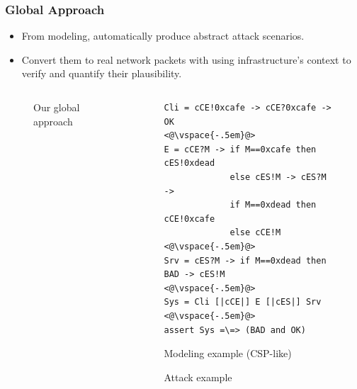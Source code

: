 \documentclass{beamer}
\begin{document}
\begin{frame}[fragile]
    \frametitle{Global Approach}
                    
    \begin{itemize}
        \item From modeling, automatically produce abstract attack scenarios.
        \item Convert them to real network packets with using infrastructure's context to verify and quantify their plausibility.
    \end{itemize}

    \begin{columns}[c]
        \begin{column}{.5\textwidth}
            \begin{figure}[htb]
                \resizebox{.95\columnwidth}{!}{
                    
                }
                \vspace{-.25em}
                \caption{Our global approach}
            \end{figure}
        \end{column}
        \begin{column}{.5\textwidth}
            \begin{figure}[htb]
\begin{lstlisting}
Cli = cCE!0xcafe -> cCE?0xcafe -> OK
<@\vspace{-.5em}@>
E = cCE?M -> if M==0xcafe then cES!0xdead
             else cES!M -> cES?M ->
             if M==0xdead then cCE!0xcafe
             else cCE!M
<@\vspace{-.5em}@>
Srv = cES?M -> if M==0xdead then BAD -> cES!M
<@\vspace{-.5em}@>
Sys = Cli [|cCE|] E [|cES|] Srv
<@\vspace{-.5em}@>
assert Sys =\=> (BAD and OK)
\end{lstlisting}
                \vspace{-1em}
                \caption{Modeling example (CSP-like)}
            \end{figure}
            \vspace{-1.5em}
            \begin{figure}[htb]
                \resizebox{.95\columnwidth}{!}{
                    
                }
                \vspace{-.5em}
                \caption{Attack example}
            \end{figure}
        \end{column}
    \end{columns}
\end{frame}
\end{document}

